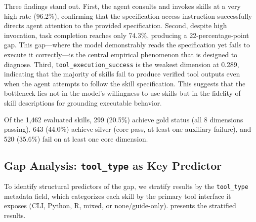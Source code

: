Three findings stand out.
First, the agent consults and invokes skills at a very high rate (96.2\%), confirming that the specification-access instruction successfully directs agent attention to the provided specification.
Second, despite high invocation, task completion reaches only 74.3\%, producing a 22-percentage-point \rbu gap.
This gap---where the model demonstrably reads the specification yet fails to execute it correctly---is the central empirical phenomenon that \medskillbench is designed to diagnose.
Third, \texttt{tool\_execution\_success} is the weakest dimension at 0.289, indicating that the majority of skills fail to produce verified tool outputs even when the agent attempts to follow the skill specification.
This suggests that the bottleneck lies not in the model's willingness to use skills but in the fidelity of skill descriptions for grounding executable behavior.

Of the 1,462 evaluated skills, 299 (20.5\%) achieve gold status (all 8 dimensions passing), 643 (44.0\%) achieve silver (core pass, at least one auxiliary failure), and 520 (35.6\%) fail on at least one core dimension.

\subsection{\rbu Gap Analysis: \texttt{tool\_type} as Key Predictor}
\label{ssec:rbu_analysis}

To identify structural predictors of the \rbu gap, we stratify results by the \texttt{tool\_type} metadata field, which categorizes each skill by the primary tool interface it exposes (CLI, Python, R, mixed, or none/guide-only).
 presents the stratified results.

\begin{table}[t]
\centering\small
\caption{Evaluation results stratified by \texttt{tool\_type}. Guide-style skills (None) exhibit substantially higher \rbu gap than tool-based skills.}
\setlength{\tabcolsep}{3pt}
\label{tab:tool_type}
\end{table}

